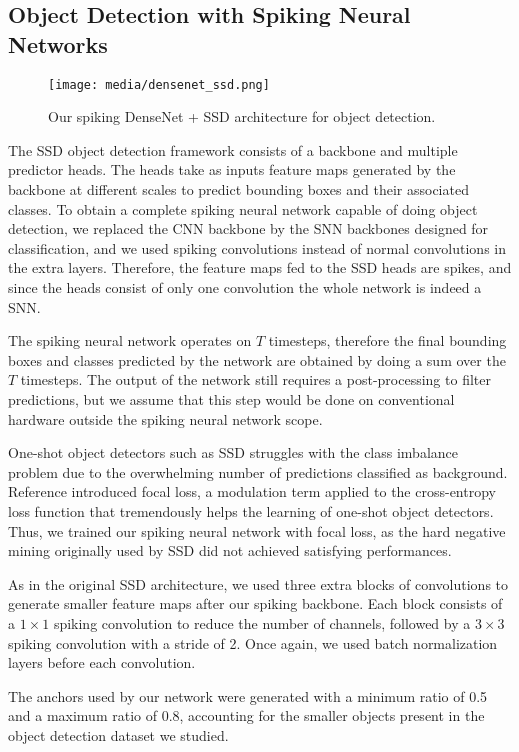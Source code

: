 \documentclass[conference]{IEEEtran}
\begin{document}
\subsection{Object Detection with Spiking Neural Networks}

\begin{figure*}[tb]
\centerline{\texttt{[image: media/densenet\_ssd.png]}}
\caption{Our spiking DenseNet + SSD architecture for object detection.}
\label{fig:od}
\end{figure*}

The SSD object detection framework \cite{ssd} consists of a backbone and multiple predictor heads. The heads take as inputs feature maps generated by the backbone at different scales to predict bounding boxes and their associated classes. To obtain a complete spiking neural network capable of doing object detection, we replaced the CNN backbone by the SNN backbones designed for classification, and we used spiking convolutions instead of normal convolutions in the extra layers. Therefore, the feature maps fed to the SSD heads are spikes, and since the heads consist of only one convolution the whole network is indeed a SNN.

The spiking neural network operates on $T$ timesteps, therefore the final bounding boxes and classes predicted by the network are obtained by doing a sum over the $T$ timesteps. The output of the network still requires a post-processing to filter predictions, but we assume that this step would be done on conventional hardware outside the spiking neural network scope.

One-shot object detectors such as SSD struggles with the class imbalance problem due to the overwhelming number of predictions classified as background. Reference \cite{focalloss} introduced focal loss, a modulation term applied to the cross-entropy loss function that tremendously helps the learning of one-shot object detectors. Thus, we trained our spiking neural network with focal loss, as the hard negative mining originally used by SSD did not achieved satisfying performances.

As in the original SSD architecture, we used three extra blocks of convolutions to generate smaller feature maps after our spiking backbone. Each block consists of a $1 \times 1$ spiking convolution to reduce the number of channels, followed by a $3 \times 3$ spiking convolution with a stride of 2. Once again, we used batch normalization layers before each convolution. 

The anchors used by our network were generated with a minimum ratio of 0.5 and a maximum ratio of 0.8, accounting for the smaller objects present in the object detection dataset we studied.
\end{document}

